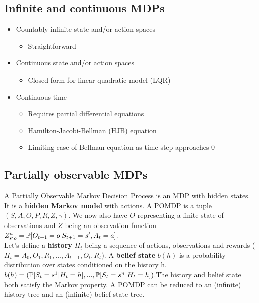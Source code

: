 \subsection{Infinite and continuous MDPs}
\begin{itemize}
	\item Countably infinite state and/or action spaces
	\begin{itemize}
		\item Straightforward
	\end{itemize}
	\item Continuous state and/or action spaces
	\begin{itemize}
		\item Closed form for linear quadratic model (LQR)
	\end{itemize}
	\item Continuous time
	\begin{itemize}
		\item Requires partial differential equations
		\item Hamilton-Jacobi-Bellman (HJB) equation
		\item Limiting case of Bellman equation as time-step approaches 0
	\end{itemize}
\end{itemize}

\subsection{Partially observable MDPs}
A Partially Observable Markov Decision Process is an MDP with hidden states. It is a \textbf{hidden Markov model} with actions. A POMDP is a tuple $(S, A, O, P, R, Z, \gamma)$. We now also have $O$ representing a finite state of observations and $Z$ being an observation function $Z^a_{s'o} = \operatorname{\mathbb{P}}[O_{t+1} = o | S_{t+1} = s', A_t = a]$.\\

Let's define a \textbf{history} $H_t$ being a sequence of actions, observations and rewards ($H_t = A_0, O_1, R_1, ..., A_{t-1}, O_t, R_t$). A \textbf{belief state} $b(h)$ is a probability distribution over states conditioned on the history h. $b(h) = (\operatorname{\mathbb{P}}[S_t = s^1 | H_t = h], ..., \operatorname{\mathbb{P}}[S_t = s^n | H_t = h])$.The history and belief state both satisfy the Markov property. A POMDP can be reduced to an (infinite) history tree and an (infinite) belief state tree.